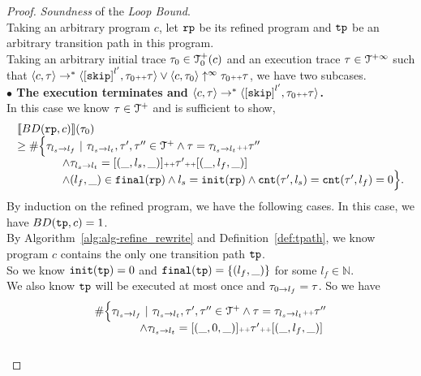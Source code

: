 \begin{proof}
\emph{Soundness} of the \emph{Loop Bound}.
  \\
  Taking an arbitrary program $c$, let $\mathtt{rp}$ be its refined program and $\mathtt{tp}$ be an arbitrary transition path in this program.
  \\
Taking an arbitrary initial trace $\mathtt{\tau}_0 \in \mathcal{T}^{+}_0(c)$  and an execution trace $\mathtt{\tau} \in \mathcal{T}^{+\infty}$
 such that $\config{{c}, \trace} \to^{*} \config{\clabel{\eskip}^{l'}, \trace_0 \tracecat \vtrace} \lor \config{c, \trace_0} \uparrow^{\infty} \trace_0 \tracecat \trace$,
 we have two subcases.
\\
\textbf{$\bullet$ The execution terminates and {$\config{{c}, \trace} \to^{*} \config{\clabel{\eskip}^{l'}, \trace_0 \tracecat \vtrace}$}.} 
\\
 In this case we know $\mathtt{\tau} \in \mathcal{T}^{+}$ and is sufficient to show,
 \[
  \begin{array}{l}
  \llbracket BD(\mathtt{rp}, c) \rrbracket(\mathtt{\tau}_0) 
  \\ \geq
  \# \Big\{\mathtt{\tau}_{l_s \to l_f} ~\vert~ \mathtt{\tau}_{l_s \to l_t}, \mathtt{\tau}', \mathtt{\tau}''\in \mathcal{T}^{+}
  \land \mathtt{\tau} = \mathtt{\tau}_{l_s \to l_t} {\scriptscriptstyle ++} \mathtt{\tau}''
  \\ \qquad \qquad
  \land \mathtt{\tau}_{l_s \to l_t} = [(\_, l_s, \_)] {\scriptscriptstyle ++} \mathtt{\tau}' {\scriptscriptstyle ++} [(\_, l_f, \_)]
  \\ \qquad \qquad
  \land (l_{f}, \_) \in \mathtt{final}(\mathtt{rp})
  \land l_s = \mathtt{init}(\mathtt{rp})
  \land \mathtt{cnt}(\mathtt{\tau}', l_s) = \mathtt{cnt}(\mathtt{\tau}', l_f) = 0 
  \Big\}.
\end{array}
\]
By induction on the refined program, we have the following cases.
\caseL{$\rprog = \tpath$}
In this case, we have $BD(\mathtt{tp}, c) = 1$.
\\
By Algorithm~\ref{alg:alg-refine_rewrite} and Definition~\ref{def:tpath}, we know program $c$ contains the only one transition path $\mathtt{tp}$.
\\
So we know $\mathtt{init}(\mathtt{tp}) = 0$ and $\mathtt{final}(\mathtt{tp}) = \{ (l_f, \_) \}$ for some $l_f \in \mathbb{N}$.
\\
We also know $\mathtt{tp}$ will be executed at most once and $\mathtt{\tau}_{0 \to l_f} = \mathtt{\tau}$. So we have
\[
  \begin{array}{l}
    \# \Big\{\mathtt{\tau}_{l_s \to l_f} ~\vert~ \mathtt{\tau}_{l_s \to l_t}, \mathtt{\tau}', \mathtt{\tau}''\in \mathcal{T}^{+}
    \land \mathtt{\tau} = \mathtt{\tau}_{l_s \to l_t} {\scriptscriptstyle ++} \mathtt{\tau}''
    \\ \qquad \qquad
    \land \mathtt{\tau}_{l_s \to l_t} = [(\_, 0, \_)] {\scriptscriptstyle ++} \mathtt{\tau}' {\scriptscriptstyle ++} [(\_, l_f, \_)]
    \\ \qquad \qquad

\end{array}\]
\end{proof}
